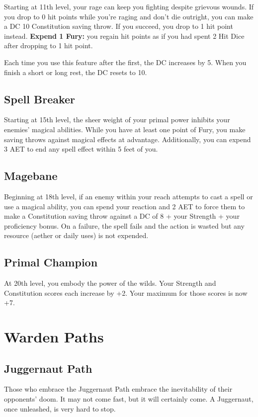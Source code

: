 Starting at 11th level, your rage can keep you fighting despite grievous wounds. If you drop to 0 hit points while you're raging and don't die outright, you can make a DC 10 Constitution saving throw. If you succeed, you drop to 1 hit point instead. \textbf{Expend 1 Fury:} you regain hit points as if you had spent 2 Hit Dice after dropping to 1 hit point.

Each time you use this feature after the first, the DC increases by 5. When you finish a short or long rest, the DC resets to 10.

\subsection{Spell Breaker}
Starting at 15th level, the sheer weight of your primal power inhibits your enemies' magical abilities. While you have at least one point of Fury, you make saving throws against magical effects at advantage. Additionally, you can expend 3 AET to end any spell effect within 5 feet of you.

\subsection{Magebane}

Beginning at 18th level, if an enemy within your reach attempts to cast a spell or use a magical ability, you can spend your reaction and 2 AET to force them to make a Constitution saving throw against a DC of 8 + your Strength + your proficiency bonus. On a failure, the spell fails and the action is wasted but any resource (aether or daily uses) is not expended.

\subsection{Primal Champion}

At 20th level, you embody the power of the wilds. Your Strength and Constitution scores each increase by +2. Your maximum for those scores is now +7.

\section{Warden Paths}

\subsection{Juggernaut Path}

Those who embrace the Juggernaut Path embrace the inevitability of their opponents' doom. It may not come fast, but it will certainly come. A Juggernaut, once unleashed, is very hard to stop.

